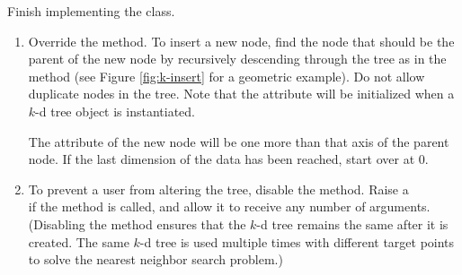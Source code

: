 \begin{comment} %
\item Write the \li{__sub__} magic method so that \li{x} - \li{y} returns the Euclidean distance between the data in node \li{x} and the data in node \li{y}.

\item Write the \li{__eq__} magic method so that \li{x == y} is \li{True} if and only if \li{x} and \li{y} have the same data (Hint: \li{np.allclose()})

\item Finally, write the \li{__lt__} and \li{__gt__} magic methods so that the $<$ and $>$ operators compare the $i^{th}$ entry of the data, where $i$ is the \li{axis} attribute of the node on the \emph{right side} of the operator.
For example,

\begin{lstlisting}
>>> x = KDTNode(np.array([1,2]))
>>> y = KDTNode(np.array([3,1]))
>>> y.axis = 0            # Compare the '0th' entry of the data
>>> x < y                # True, since 1 < 3
True
>>> x > y
False

>>> y.axis = 1            # Compare the '1st' entry of the data
>>> x < y                # False, since 2 > 1
False
>>> x > y
True
\end{lstlisting}
\end{comment}
Finish implementing the  class.
\begin{enumerate}
\item Override the  method.
To insert a new node, find the node that should be the parent of the new node by recursively descending through the tree as in the  method (see Figure \ref{fig:k-insert} for a geometric example).
Do not allow duplicate nodes in the tree.
Note that the  attribute will be initialized when a $k$-d tree object is instantiated.

The  attribute of the new node will be one more than that axis of the parent node.
If the last dimension of the data has been reached, start  over at 0.

\item %
To prevent a user from altering the tree, disable the  method.
Raise a \\  if the method is called, and allow it to receive any number of arguments.
(Disabling the  method ensures that the $k$-d tree remains the same after it is created.
The same $k$-d tree is used multiple times with different target points to solve the nearest neighbor search problem.)
\end{enumerate}
